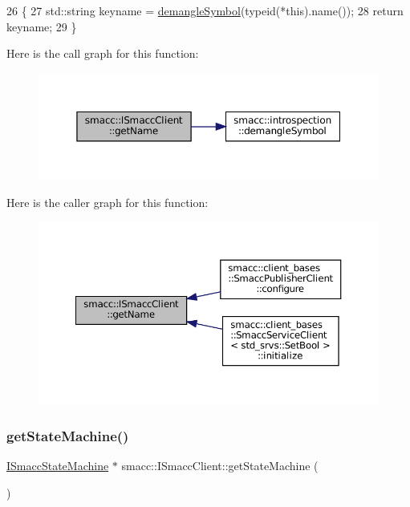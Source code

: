 \begin{DoxyCode}
26 \{
27     std::string keyname = \hyperlink{namespacesmacc_1_1introspection_a2f495108db3e57604d8d3ff5ef030302}{demangleSymbol}(\textcolor{keyword}{typeid}(*this).name());
28     \textcolor{keywordflow}{return} keyname;
29 \}
\end{DoxyCode}
Here is the call graph for this function\+:
\nopagebreak
\begin{figure}[H]
\begin{center}
\leavevmode
\includegraphics[width=350pt]{classsmacc_1_1ISmaccClient_a8c3ce19f182e71909c5dc6263d25be69_cgraph}
\end{center}
\end{figure}
Here is the caller graph for this function\+:
\nopagebreak
\begin{figure}[H]
\begin{center}
\leavevmode
\includegraphics[width=350pt]{classsmacc_1_1ISmaccClient_a8c3ce19f182e71909c5dc6263d25be69_icgraph}
\end{center}
\end{figure}
\mbox{\label{classsmacc_1_1ISmaccClient_aec51d4712404cb9882b86e4c854bb93a}} 
\subsubsection{\texorpdfstring{get\+State\+Machine()}{getStateMachine()}}
{\footnotesize\ttfamily \hyperlink{classsmacc_1_1ISmaccStateMachine}{I\+Smacc\+State\+Machine} $\ast$ smacc\+::\+I\+Smacc\+Client\+::get\+State\+Machine (\begin{DoxyParamCaption}{ }\end{DoxyParamCaption})\hspace{0.3cm}{\ttfamily [inline]}}



